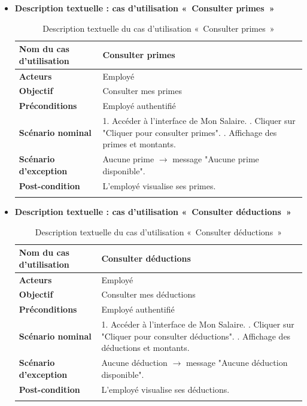 \begin{itemize}
\item \textbf{Description textuelle : cas d'utilisation «~Consulter primes~»}

\begin{center}
\begin{longtable}{|p{5cm}|p{11cm}|}
\hline
\textbf{Nom du cas d'utilisation} & Consulter primes \\ \hline
\textbf{Acteurs} & Employé \\ \hline
\textbf{Objectif} & Consulter mes primes \\ \hline
\textbf{Préconditions} & Employé authentifié \\ \hline
\textbf{Scénario nominal} &
1. Accéder à l'interface de Mon Salaire. \newline
2. Cliquer sur "Cliquer pour consulter primes". \newline
3. Affichage des primes et montants. \\ \hline
\textbf{Scénario d'exception} & Aucune prime $\rightarrow$ message "Aucune prime disponible". \\ \hline
\textbf{Post-condition} & L'employé visualise ses primes. \\ \hline
\caption{Description textuelle du cas d'utilisation «~Consulter primes~»}
\end{longtable}
\end{center}

\item \textbf{Description textuelle : cas d'utilisation «~Consulter déductions~»}

\begin{center}
\begin{longtable}{|p{5cm}|p{11cm}|}
\hline
\textbf{Nom du cas d'utilisation} & Consulter déductions \\ \hline
\textbf{Acteurs} & Employé \\ \hline
\textbf{Objectif} & Consulter mes déductions \\ \hline
\textbf{Préconditions} & Employé authentifié \\ \hline
\textbf{Scénario nominal} &
1. Accéder à l'interface de Mon Salaire. \newline
2. Cliquer sur "Cliquer pour consulter déductions". \newline
3. Affichage des déductions et montants. \\ \hline
\textbf{Scénario d'exception} & Aucune déduction $\rightarrow$ message "Aucune déduction disponible". \\ \hline
\textbf{Post-condition} & L'employé visualise ses déductions. \\ \hline
\caption{Description textuelle du cas d'utilisation «~Consulter déductions~»}
\end{longtable}
\end{center}


\end{itemize}
